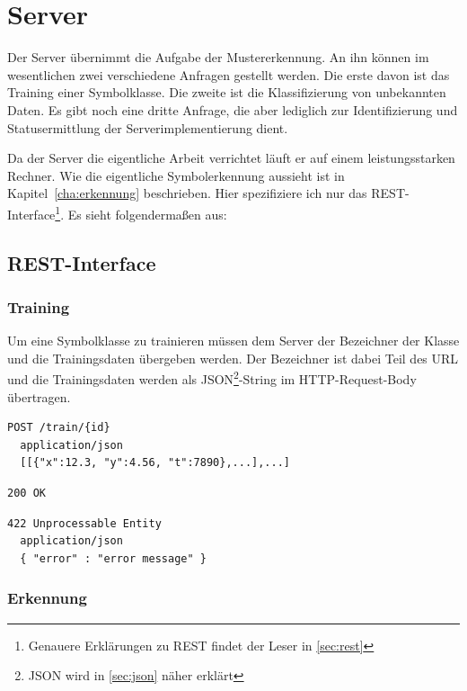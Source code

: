 

\section{Server} %
\label{sec:server}

Der Server übernimmt die Aufgabe der Mustererkennung. An ihn können im wesentlichen zwei verschiedene Anfragen gestellt werden. Die erste davon ist das Training einer Symbolklasse. Die zweite ist die Klassifizierung von unbekannten Daten. Es gibt noch eine dritte Anfrage, die aber lediglich zur Identifizierung und Statusermittlung der Serverimplementierung dient.

Da der Server die eigentliche Arbeit verrichtet läuft er auf einem leistungsstarken Rechner. Wie die eigentliche Symbolerkennung aussieht ist in Kapitel~\ref{cha:erkennung} beschrieben. Hier spezifiziere ich nur das \ac{REST}-Interface\footnote{Genauere Erklärungen zu \ac{REST} findet der Leser in \ref{sec:rest}}. Es sieht folgendermaßen aus:

\subsection{REST-Interface} %
\label{sub:rest_interface}

\subsubsection{Training}

Um eine Symbolklasse zu trainieren müssen dem Server der Bezeichner der Klasse und die Trainingsdaten übergeben werden. Der Bezeichner ist dabei Teil des \ac{URL} und die Trainingsdaten werden als \ac{JSON}\footnote{JSON wird in \ref{sec:json} näher erklärt}-String im \ac{HTTP}-Request-Body übertragen.

\begin{lstlisting}[caption={Anfrage}]
  POST /train/{id}
  application/json
  [[{"x":12.3, "y":4.56, "t":7890},...],...]
\end{lstlisting}
\begin{lstlisting}[caption={Antwort}]
  200 OK
\end{lstlisting}
\begin{lstlisting}[caption={Antwort im Fehlerfall}]
  422 Unprocessable Entity
  application/json
  { "error" : "error message" }
\end{lstlisting}

\subsubsection{Erkennung}
\label{subsub:erkennung}

